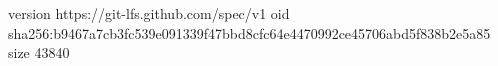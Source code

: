 version https://git-lfs.github.com/spec/v1
oid sha256:b9467a7cb3fc539e091339f47bbd8cfc64e4470992ce45706abd5f838b2e5a85
size 43840

